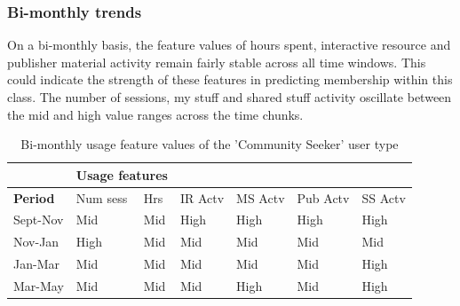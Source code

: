 \documentclass{acm_proc_article-sp}
\begin{document}
\subsubsection{Bi-monthly trends}
On a bi-monthly basis, the feature values of hours spent, interactive resource and publisher material activity remain fairly stable across all time windows. This could indicate the strength of these features in predicting membership within this class. The number of sessions, my stuff and shared stuff activity oscillate between the mid and high value ranges across the time chunks.  
\begin{table}
\caption{Bi-monthly usage feature values of the 'Community Seeker' user type}
\label{cluster1bimonthly}
\begin{tabular}{|p{1.5cm}|p{0.6cm}|p{0.6cm}|p{0.6cm}|p{0.6cm}|p{0.8cm}|p{0.8cm}|}
& \multicolumn{2}{r}{\textbf{Usage features}}  \\ \hline
 \textbf{Period} 
 & Num sess & Hrs & IR Actv & MS Actv & Pub Actv & SS Actv \\ \hline
Sept-Nov & Mid & Mid  & High & High & High & High \\ \hline
Nov-Jan & High & Mid  & Mid & Mid & Mid & Mid \\ \hline
Jan-Mar & Mid & Mid  & Mid & Mid & Mid & High \\ \hline
Mar-May & Mid & Mid  & Mid & High & Mid & High \\ \hline
\end{tabular}
\end{table}
\end{document}
